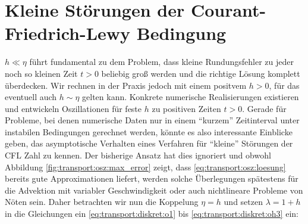 \section{Kleine Störungen der Courant-Friedrich-Lewy Bedingung}\label{sec:transport:kleineta}

$h \ll \eta$ führt fundamental zu dem Problem, dass kleine Rundungsfehler zu jeder noch so kleinen Zeit $t > 0$ beliebig groß werden und die richtige Lösung komplett überdecken.
Wir rechnen in der Praxis jedoch mit einem positvem $h > 0$, für das eventuell auch $h \sim \eta$ gelten kann.
Konkrete numerische Realisierungen existieren und entwickeln Oszillationen für feste $h$ zu positiven Zeiten $t > 0$.
Gerade für Probleme, bei denen numerische Daten nur in einem ``kurzem'' Zeitinterval unter instabilen Bedingungen gerechnet werden, könnte es also interessante Einblicke geben, das asymptotische Verhalten eines Verfahren für ``kleine'' Störungen der CFL Zahl zu kennen.
Der bisherige Ansatz hat dies ignoriert und obwohl Abbildung \ref{fig:transport:osz:max_error} zeigt, dass \eqref{eq:transport:osz:loesung} bereits gute Approximationen liefert, werden solche Überlegungen spätestens für die Advektion mit variabler Geschwindigkeit oder auch nichtlineare Probleme von Nöten sein.
Daher betrachten wir nun die Koppelung $\eta = h$ und setzen $\lambda = 1 + h$ in die Gleichungen ein \eqref{eq:transport:diskret:o1} bis \eqref{eq:transport:diskret:oh3} ein:

